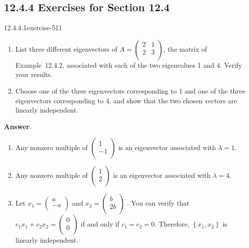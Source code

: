 \documentclass[twoside,10pt,]{book}
\numberwithin{equation}{section}
\begin{document}
\subsection*{12.4.4 Exercises for Section 12.4}
\begin{divisionsolution}{12.4.4.1}{}{exercise-511}%
\hypertarget{p-4615}{}%
\leavevmode%
\begin{enumerate}[label=(\alph*)]
\item\hypertarget{li-2100}{}\hypertarget{p-4616}{}%
List three different eigenvectors of \(A=\left(
\begin{array}{cc}
2 & 1 \\
2 & 3 \\
\end{array}
\right)\), the matrix of Example~12.4.2, associated with each of the two eigenvalues 1 and 4.   Verify your results.%
\item\hypertarget{li-2101}{}\hypertarget{p-4617}{}%
Choose one of the three eigenvectors corresponding to 1 and one of the three eigenvectors corresponding to 4, and show that the two chosen vectors are linearly independent.%
\end{enumerate}
%
\par\smallskip%
\noindent\textbf{Answer}.\quad%
\hypertarget{p-4618}{}%
\leavevmode%
\begin{enumerate}[label=(\alph*)]
\item\hypertarget{li-2102}{}\hypertarget{p-4619}{}%
Any nonzero multiple of \(\left(
\begin{array}{c}
1 \\
-1 \\
\end{array}
\right)\) is an eigenvector associated with \(\lambda =1\).%
\item\hypertarget{li-2103}{}\hypertarget{p-4620}{}%
Any nonzero multiple of \(\left(
\begin{array}{c}
1 \\
2 \\
\end{array}
\right)\) is an eigenvector associated with \(\lambda =4\).%
\item\hypertarget{li-2104}{}\hypertarget{p-4621}{}%
Let \(x_1=\left(
\begin{array}{c}
a \\
-a \\
\end{array}
\right)\) and \(x_2=\left(
\begin{array}{c}
b \\
2b \\
\end{array}
\right)\) .  You can verify that  \(c_1x_1+ c_2x_2=\left(
\begin{array}{c}
0 \\
0 \\
\end{array}
\right)\)  if and only if \(c_1= c_2= 0.\)  Therefore, \(\left\{x_1,x_2\right\}\) is linearly independent.%
\end{enumerate}
%
\end{divisionsolution}%
\end{document}
